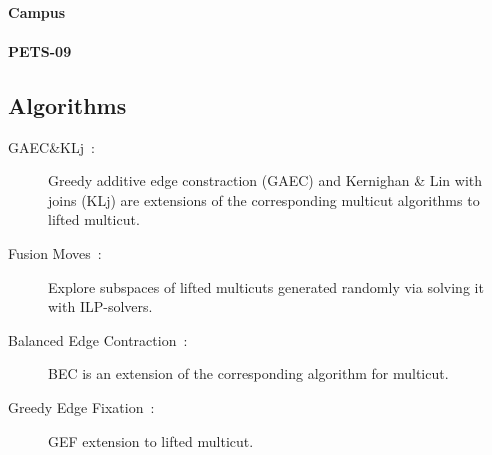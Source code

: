 \paragraph{Campus}
\paragraph{PETS-09}

\subsection{Algorithms}
\begin{description}
\item[GAEC\&KLj~\cite{keuper2015efficient}:] Greedy additive edge constraction (GAEC) and Kernighan \& Lin with joins (KLj) are extensions of the corresponding multicut algorithms to lifted multicut.
\item[Fusion Moves~\cite{beier2017multicut}:] Explore subspaces of lifted multicuts generated randomly via solving it with ILP-solvers.
\item[Balanced Edge Contraction~\cite{kardoost2018solving}:] BEC is an extension of the corresponding algorithm for multicut.
\item[Greedy Edge Fixation~\cite{levinkov2019comparative}:] GEF extension to lifted multicut.
\end{description}
